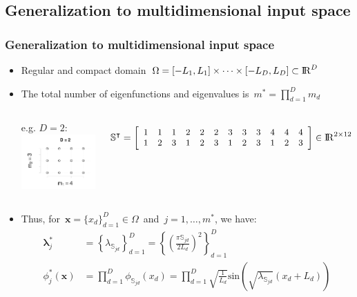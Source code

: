 \documentclass[8pt]{beamer} %
\begin{document}
\subsection*{Generalization to multidimensional input space}
\begin{frame}\frametitle{\normalsize Generalization to multidimensional input space}

\begin{itemize}\setlength\itemsep{2mm}
\item Regular and compact domain\, $\Omega=[-L_1,L_1] \times \dots \times [-L_D,L_D] \subset {\rm I\!R}^D$

\item The total number of eigenfunctions and eigenvalues is\, $m^{\ast} = \prod_{d=1}^{D} m_d$ %

\vspace{4mm}
\begin{columns}
\centering
 {\small e.g. $D=2$:} \\[1mm]
 \includegraphics[width=4cm, trim = 0mm 0mm 0mm 20mm, clip]{HSGP_fig3.pdf}

\begin{align*}\small
\mathbb{S}^\intercal=
\left[ {\begin{array}{cccccccccccc}
1 & 1 & 1 & 2 & 2 & 2 & 3 & 3 & 3 & 4 & 4 & 4  \\
1 & 2 & 3 & 1 & 2 & 3 & 1 & 2 & 3 & 1 & 2 & 3  
\end{array} } \right] \in {\rm I\!R}^{2\times 12}
\end{align*} 
\end{columns}

\vspace{-2mm}
\item Thus, for\, $\bm{x}=\{x_d\}_{d=1}^D \in \Omega$\, and\, $j=1,\ldots,m^{\ast}$, we have:
%
\begin{align*}
\bm{\lambda}^{\ast}_j &= \left\{ \lambda_{\mathbb{S}_{jd}} \right\}_{d=1}^D =  \left\{ \left(\tfrac{\pi \mathbb{S}_{jd}}{2L_d}\right)^2 \right\}_{d=1}^D \\[1mm]
%
\phi^{\ast}_j(\bm{x}) &= \prod_{d=1}^{D} \phi_{\mathbb{S}_{jd}}(x_d) = \prod_{d=1}^{D} \sqrt{\frac{1}{L_d}} \text{sin}\left(\sqrt{\lambda_{\mathbb{S}_{jd}}}(x_d+L_d)\right)
\end{align*}

\end{itemize}
\end{frame}
\end{document}
